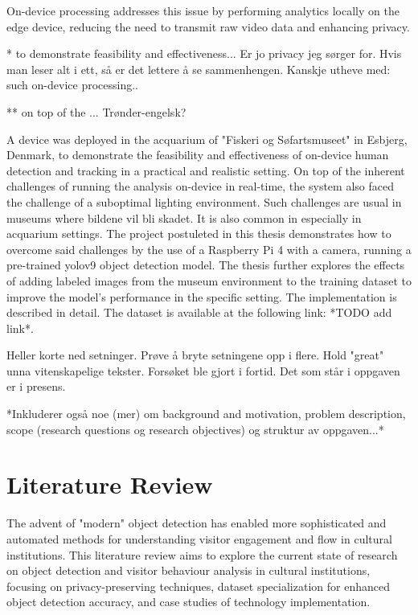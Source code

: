On-device processing addresses this issue by performing analytics locally on the edge device, reducing the need to transmit raw video data and enhancing privacy.  

* to demonstrate feasibility and effectiveness... Er jo privacy jeg sørger for. Hvis man leser alt i ett, så er det lettere å se sammenhengen. Kanskje utheve med: such on-device processing..

** on top of the ... Trønder-engelsk?

A device was deployed in the acquarium of "Fiskeri og Søfartsmuseet" in Esbjerg, Denmark, to demonstrate the feasibility and effectiveness of on-device human detection and tracking in a practical and realistic setting. On top of the inherent challenges of running the analysis on-device in real-time, the system also faced the challenge of a suboptimal lighting environment. Such challenges are usual in museums where bildene vil bli skadet. It is also common in especially in acquarium settings. The project postuleted in this thesis demonstrates how to overcome said challenges by the use of a Raspberry Pi 4 with a camera, running a pre-trained yolov9 object detection model. The thesis further explores the effects of adding labeled images from the museum environment to the training dataset to improve the model's performance in the specific setting. The implementation is described in detail. The dataset is available at the following link: *TODO add link*. 

Heller korte ned setninger. Prøve å bryte setningene opp i flere. Hold "great" unna vitenskapelige tekster. Forsøket ble gjort i fortid. Det som står i oppgaven er i presens.

*Inkluderer også noe (mer) om background and motivation, problem description, scope (research questions og research objectives) og struktur av oppgaven...*

\section{Literature Review}
The advent of "modern" object detection has enabled more sophisticated and automated methods for understanding visitor engagement and flow in cultural institutions. This literature review aims to explore the current state of research on object detection and visitor behaviour analysis in cultural institutions, focusing on privacy-preserving techniques, dataset specialization for enhanced object detection accuracy, and case studies of technology implementation. 

